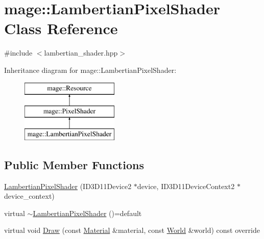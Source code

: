 \hypertarget{classmage_1_1_lambertian_pixel_shader}{}\section{mage\+:\+:Lambertian\+Pixel\+Shader Class Reference}
\label{classmage_1_1_lambertian_pixel_shader}


{\ttfamily \#include $<$lambertian\+\_\+shader.\+hpp$>$}

Inheritance diagram for mage\+:\+:Lambertian\+Pixel\+Shader\+:\begin{figure}[H]
\begin{center}
\leavevmode
\includegraphics[height=3.000000cm]{classmage_1_1_lambertian_pixel_shader}
\end{center}
\end{figure}
\subsection*{Public Member Functions}
\begin{DoxyCompactItemize}
\item 
\hyperlink{classmage_1_1_lambertian_pixel_shader_a5f16778caf62403d148bf5edee042935}{Lambertian\+Pixel\+Shader} (I\+D3\+D11\+Device2 $\ast$device, I\+D3\+D11\+Device\+Context2 $\ast$device\+\_\+context)
\item 
virtual \hyperlink{classmage_1_1_lambertian_pixel_shader_aedea7342ae95c6532a086fb28978b5b0}{$\sim$\+Lambertian\+Pixel\+Shader} ()=default
\item 
virtual void \hyperlink{classmage_1_1_lambertian_pixel_shader_a7394a51578de77cd7e57b9bd63895ffd}{Draw} (const \hyperlink{structmage_1_1_material}{Material} \&material, const \hyperlink{classmage_1_1_world}{World} \&world) const override
\end{DoxyCompactItemize}
